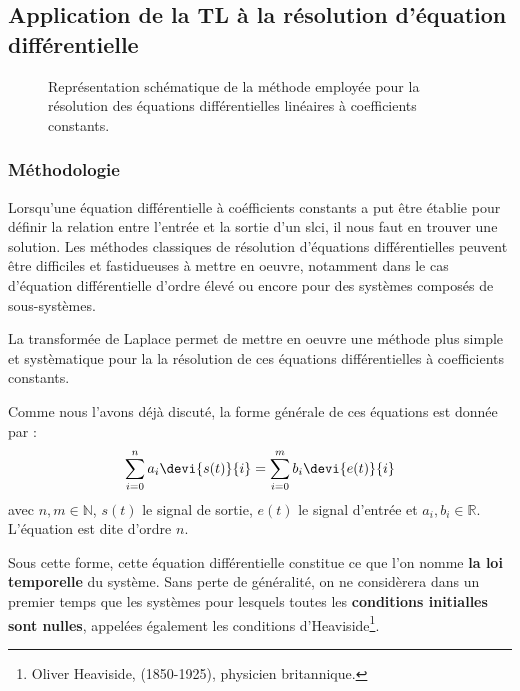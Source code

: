 \subsection[Application de la transformée de Laplace]{Application de la TL à la résolution d'équation différentielle}

\begin{figure}[!ht]
\begin{center}

\end{center}
\caption{Représentation schématique de la méthode employée pour la résolution
des équations différentielles linéaires à coefficients constants.\label{fig-laplace_schema}}
\end{figure}
\subsubsection{Méthodologie}
Lorsqu'une équation différentielle à coéfficients constants a put être établie
pour définir la relation entre l'entrée et la sortie d'un \gls{slci}, il nous faut
en trouver une solution.
Les méthodes classiques de résolution d'équations différentielles 
peuvent être difficiles et fastidueuses à mettre en oeuvre, notamment dans le cas d'équation 
différentielle d'ordre élevé ou encore pour des systèmes composés de sous-systèmes.

La transformée de Laplace permet de mettre en oeuvre une méthode plus simple et 
systèmatique  pour la la résolution de ces équations différentielles à coefficients constants.

Comme nous l'avons déjà discuté, la forme générale de ces équations est donnée par :
\begin{align}
    \sum_{i=0}^{n}a_i\devi{s(t)}{i}=\sum_{i=0}^{m}b_i\devi{e(t)}{i}\label{eq-ltemp}
\end{align}
avec $n,m\in\mathbb{N}$, $s(t)$ le signal de sortie, $e(t)$ le signal d'entrée et $a_i,b_i\in\mathbb{R}$.
L'équation est dite d'ordre $n$.

Sous cette forme, cette équation différentielle constitue ce que l'on nomme \textbf{la loi temporelle} du système.
Sans perte de généralité, on ne considèrera dans un premier temps 
que les systèmes pour lesquels toutes les 
\textbf{conditions initialles sont nulles}, appelées également les conditions 
d'Heaviside\footnote{Oliver Heaviside, (1850-1925), physicien britannique.}.

